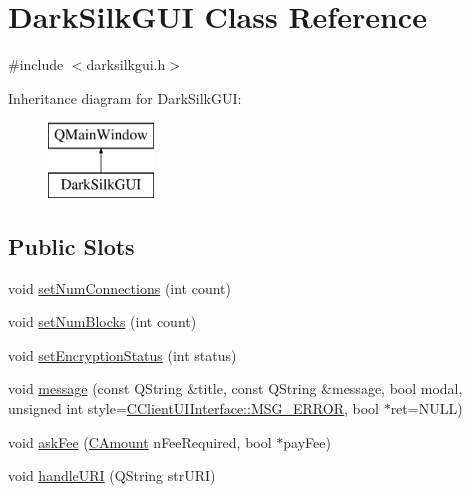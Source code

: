 \hypertarget{class_dark_silk_g_u_i}{}\section{Dark\+Silk\+G\+U\+I Class Reference}
\label{class_dark_silk_g_u_i}


{\ttfamily \#include $<$darksilkgui.\+h$>$}

Inheritance diagram for Dark\+Silk\+G\+U\+I\+:\begin{figure}[H]
\begin{center}
\leavevmode
\includegraphics[height=2.000000cm]{class_dark_silk_g_u_i}
\end{center}
\end{figure}
\subsection*{Public Slots}
\begin{DoxyCompactItemize}
\item 
void \hyperlink{class_dark_silk_g_u_i_a7e1e79546bee2c49830d7d11c9bee8bb}{set\+Num\+Connections} (int count)
\item 
void \hyperlink{class_dark_silk_g_u_i_a2a303132be32277f46691fe91803f766}{set\+Num\+Blocks} (int count)
\item 
void \hyperlink{class_dark_silk_g_u_i_a4be47e469eccc462eec6556b8b8ffb52}{set\+Encryption\+Status} (int status)
\item 
void \hyperlink{class_dark_silk_g_u_i_aa5509e7f1502f9b9bc3dd916a31c8d15}{message} (const Q\+String \&title, const Q\+String \&message, bool modal, unsigned int style=\hyperlink{class_c_client_u_i_interface_a568cf07ecac3fac224d63b42a32e8bc1a0551e67c07eb6a81edf6e43fed89759f}{C\+Client\+U\+I\+Interface\+::\+M\+S\+G\+\_\+\+E\+R\+R\+O\+R}, bool $\ast$ret=N\+U\+L\+L)
\item 
void \hyperlink{class_dark_silk_g_u_i_aff74bbf8244654f663188e4589d8e311}{ask\+Fee} (\hyperlink{amount_8h_a4eaf3a5239714d8c45b851527f7cb564}{C\+Amount} n\+Fee\+Required, bool $\ast$pay\+Fee)
\item 
void \hyperlink{class_dark_silk_g_u_i_abd255bcdc761c0ed6ea5e3eb285be1d0}{handle\+U\+R\+I} (Q\+String str\+U\+R\+I)
\end{DoxyCompactItemize}
